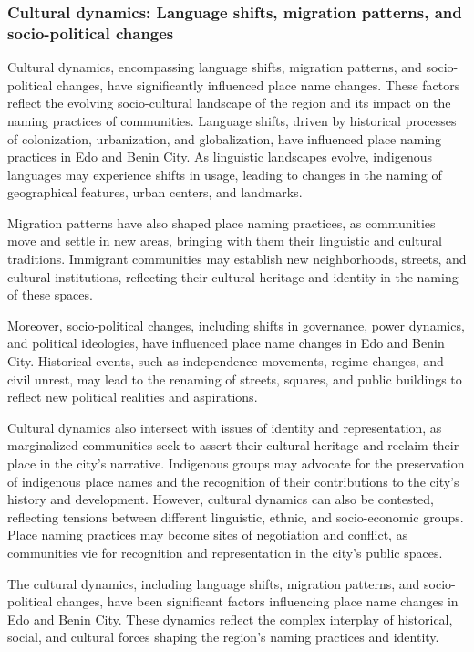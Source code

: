 \subsubsection{Cultural dynamics: Language shifts, migration patterns, and socio-political changes}
Cultural dynamics, encompassing language shifts, migration patterns, and socio-political changes, have significantly influenced place name changes\cite{lanati2021cultural}. These factors reflect the evolving socio-cultural landscape of the region and its impact on the naming practices of communities\cite{aigimoukhuede2018benin}.
Language shifts, driven by historical processes of colonization, urbanization, and globalization, have influenced place naming practices in Edo and Benin City. As linguistic landscapes evolve, indigenous languages may experience shifts in usage, leading to changes in the naming of geographical features, urban centers, and landmarks\cite{egharevba1968short}.

Migration patterns have also shaped place naming practices, as communities move and settle in new areas, bringing with them their linguistic and cultural traditions. Immigrant communities may establish new neighborhoods, streets, and cultural institutions, reflecting their cultural heritage and identity in the naming of these spaces.

Moreover, socio-political changes, including shifts in governance, power dynamics, and political ideologies, have influenced place name changes in Edo and Benin City. Historical events, such as independence movements, regime changes, and civil unrest, may lead to the renaming of streets, squares, and public buildings to reflect new political realities and aspirations\cite{aigimoukhuede2018benin,egharevba1968short}.

Cultural dynamics also intersect with issues of identity and representation, as marginalized communities seek to assert their cultural heritage and reclaim their place in the city's narrative. Indigenous groups may advocate for the preservation of indigenous place names and the recognition of their contributions to the city's history and development\cite{egharevba1968short}.
However, cultural dynamics can also be contested, reflecting tensions between different linguistic, ethnic, and socio-economic groups. Place naming practices may become sites of negotiation and conflict, as communities vie for recognition and representation in the city's public spaces.

The cultural dynamics, including language shifts, migration patterns, and socio-political changes, have been significant factors influencing place name changes in Edo and Benin City. These dynamics reflect the complex interplay of historical, social, and cultural forces shaping the region's naming practices and identity.
